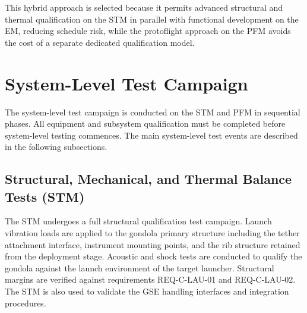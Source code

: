 This hybrid approach is selected because it permits advanced structural and thermal qualification on the STM in parallel with functional development on the EM, reducing schedule risk, while the protoflight approach on the PFM avoids the cost of a separate dedicated qualification model. 



\section{System-Level Test Campaign}

The system-level test campaign is conducted on the STM and PFM in sequential phases. All equipment and subsystem qualification must be completed before system-level testing commences. The main system-level test events are described in the following subsections.

\subsection{Structural, Mechanical, and Thermal Balance Tests (STM)}

The STM undergoes a full structural qualification test campaign. Launch vibration loads are applied to the gondola primary structure including the tether attachment interface, instrument mounting points, and the rib structure retained from the deployment stage. Acoustic and shock tests are conducted to qualify the gondola against the launch environment of the target launcher. Structural margins are verified against requirements REQ-C-LAU-01 and REQ-C-LAU-02. The STM is also used to validate the GSE handling interfaces and integration procedures.

